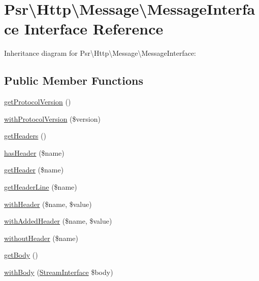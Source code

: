 \hypertarget{interfacePsr_1_1Http_1_1Message_1_1MessageInterface}{}\section{Psr\textbackslash{}Http\textbackslash{}Message\textbackslash{}Message\+Interface Interface Reference}
\label{interfacePsr_1_1Http_1_1Message_1_1MessageInterface}


Inheritance diagram for Psr\textbackslash{}Http\textbackslash{}Message\textbackslash{}Message\+Interface\+:
\subsection*{Public Member Functions}
\begin{DoxyCompactItemize}
\item 
\hyperlink{interfacePsr_1_1Http_1_1Message_1_1MessageInterface_af9eb3a7d44050ba1b4792c0332635121}{get\+Protocol\+Version} ()
\item 
\hyperlink{interfacePsr_1_1Http_1_1Message_1_1MessageInterface_a63bd49651348e467eb17abce422f325e}{with\+Protocol\+Version} (\$version)
\item 
\hyperlink{interfacePsr_1_1Http_1_1Message_1_1MessageInterface_a510ab87eb5cce38a8bb4cbec8f3f7565}{get\+Headers} ()
\item 
\hyperlink{interfacePsr_1_1Http_1_1Message_1_1MessageInterface_ab0dd1286bce947f7bd29d36df09b4c12}{has\+Header} (\$name)
\item 
\hyperlink{interfacePsr_1_1Http_1_1Message_1_1MessageInterface_a34a66651408f54c5d26d68b7796ecad6}{get\+Header} (\$name)
\item 
\hyperlink{interfacePsr_1_1Http_1_1Message_1_1MessageInterface_a0b6d444ab0d3241c0d58ad7186c57e97}{get\+Header\+Line} (\$name)
\item 
\hyperlink{interfacePsr_1_1Http_1_1Message_1_1MessageInterface_a4648889c9007ddb25adf65ef4cb2a612}{with\+Header} (\$name, \$value)
\item 
\hyperlink{interfacePsr_1_1Http_1_1Message_1_1MessageInterface_ad3066660a3b746f52eee7c8996d22981}{with\+Added\+Header} (\$name, \$value)
\item 
\hyperlink{interfacePsr_1_1Http_1_1Message_1_1MessageInterface_a8f7d926ece92b019554c42e00911ac3e}{without\+Header} (\$name)
\item 
\hyperlink{interfacePsr_1_1Http_1_1Message_1_1MessageInterface_a7d016c18bd79d98029cf538a59827421}{get\+Body} ()
\item 
\hyperlink{interfacePsr_1_1Http_1_1Message_1_1MessageInterface_a45af72ddafb601548ea60d0ddd961e65}{with\+Body} (\hyperlink{interfacePsr_1_1Http_1_1Message_1_1StreamInterface}{Stream\+Interface} \$body)
\end{DoxyCompactItemize}


